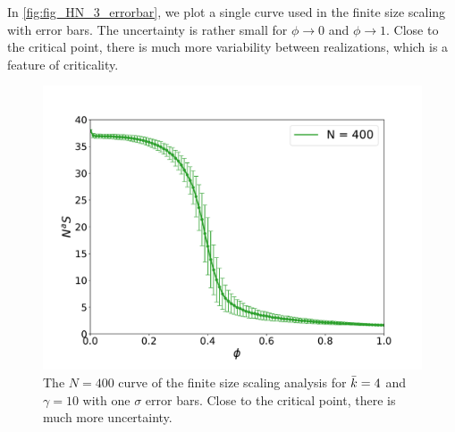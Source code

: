 \documentclass[11pt]{article}
\begin{document}
In \autoref{fig:fig_HN_3_errorbar}, we plot a single curve used in the finite size scaling with error bars. The uncertainty is rather small for $\phi\rightarrow0$ and $\phi\rightarrow1$. Close to the critical point, there is much more variability between realizations, which is a feature of criticality.
\begin{figure}[h]
    \centering
    \includegraphics[width =0.8\linewidth]{figures/Fig3_n400_errorbar.pdf}
    \caption{The $N=400$ curve of the finite size scaling analysis for $\Bar{k}= 4$ and $\gamma = 10$ with one $\sigma$ error bars. Close to the critical point, there is much more uncertainty.
}
    \label{fig:fig_HN_3_errorbar}
\end{figure}
\end{document}
